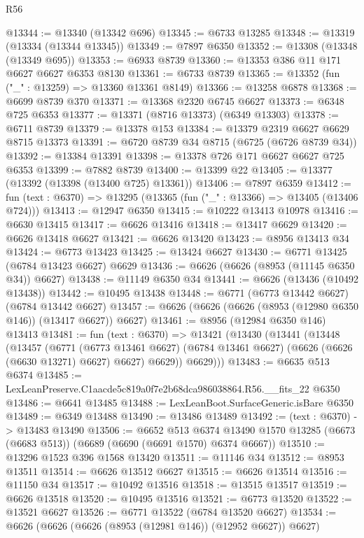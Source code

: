 \begin{lexlean}{R56}
\begin{coremodule}
@13344 := @13340 (@13342 @696)
@13345 := @6733 @13285
@13348 := @13319 (@13334 (@13344 @13345))
@13349 := @7897 @6350
@13352 := @13308 (@13348 (@13349 @695))
@13353 := @6933 @8739
@13360 := @13353 @386 @11 @171 @6627 @6627 @6353 @8130
@13361 := @6733 @8739
@13365 := @13352 (fun ("_" : @13259) => @13360 @13361 @8149)
@13366 := @13258 @6878
@13368 := @6699 @8739 @370
@13371 := @13368 @2320 @6745 @6627
@13373 := @6348 @725 @6353
@13377 := @13371 (@8716 @13373) (@6349 @13303)
@13378 := @6711 @8739
@13379 := @13378 @153
@13384 := @13379 @2319 @6627 @6629 @8715 @13373
@13391 := @6720 @8739 @34 @8715 (@6725 (@6726 @8739 @34))
@13392 := @13384 @13391
@13398 := @13378 @726 @171 @6627 @6627 @725 @6353
@13399 := @7882 @8739
@13400 := @13399 @22
@13405 := @13377 (@13392 (@13398 (@13400 @725) @13361))
@13406 := @7897 @6359
@13412 := fun (text : @6370) => @13295 (@13365 (fun ("_" : @13366) => @13405 (@13406 @724)))
@13413 := @12947 @6350
@13415 := @10222 @13413 @10978
@13416 := @6630 @13415
@13417 := @6626 @13416
@13418 := @13417 @6629
@13420 := @6626 @13418 @6627
@13421 := @6626 @13420
@13423 := @8956 @13413 @34
@13424 := @6773 @13423
@13425 := @13424 @6627
@13430 := @6771 @13425 (@6784 @13423 @6627) @6629
@13436 := @6626 (@6626 (@8953 (@11145 @6350 @34)) @6627)
@13438 := @11149 @6350 @34
@13441 := @6626 (@13436 (@10492 @13438))
@13442 := @10495 @13438
@13448 := @6771 (@6773 @13442 @6627) (@6784 @13442 @6627)
@13457 := @6626 (@6626 (@6626 (@8953 (@12980 @6350 @146)) (@13417 @6627)) @6627)
@13461 := @8956 (@12984 @6350 @146) @13413
@13481 := fun (text : @6370) =>
  @13421
    (@13430
      (@13441
        (@13448
          (@13457
            (@6771
              (@6773 @13461 @6627)
              (@6784 @13461 @6627)
              (@6626 (@6626 (@6630 @13271) @6627) @6627)
              @6629))
          @6629)))
@13483 := @6635 @513 @6374
@13485 := LexLeanPreserve.C1aacde5c819a0f7e2b68dca986038864.R56.__fits_22 @6350
@13486 := @6641 @13485
@13488 := LexLeanBoot.SurfaceGeneric.isBare @6350
@13489 := @6349 @13488
@13490 := @13486 @13489
@13492 := (text : @6370) -> @13483 @13490
@13506 := @6652
    @513
    @6374
    @13490
    @1570
    @13285
    (@6673 (@6683 @513))
    (@6689 (@6690 (@6691 @1570) @6374 @6667))
@13510 := @13296 @1523 @396 @1568 @13420
@13511 := @11146 @34
@13512 := @8953 @13511
@13514 := @6626 @13512 @6627
@13515 := @6626 @13514
@13516 := @11150 @34
@13517 := @10492 @13516
@13518 := @13515 @13517
@13519 := @6626 @13518
@13520 := @10495 @13516
@13521 := @6773 @13520
@13522 := @13521 @6627
@13526 := @6771 @13522 (@6784 @13520 @6627)
@13534 := @6626 (@6626 (@6626 (@8953 (@12981 @146)) (@12952 @6627)) @6627)

\end{coremodule}
\end{lexlean}
